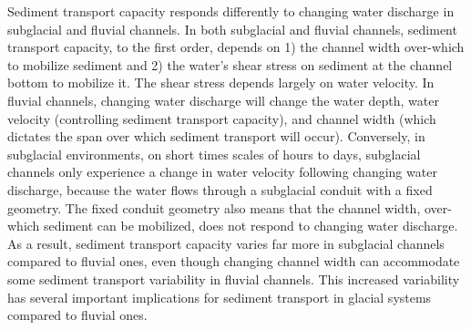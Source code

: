 \documentclass[11pt]{article}
\begin{document}
        \laysummary %
        Sediment transport capacity responds differently to changing water discharge in subglacial and fluvial channels.
        In both subglacial and fluvial channels, sediment transport capacity, to the first order, depends on 1) the channel width over-which to mobilize sediment and 2) the water's shear stress on sediment at the channel bottom to mobilize it.
        The shear stress depends largely on water velocity.
        In fluvial channels, changing water discharge will change the water depth, water velocity (controlling sediment transport capacity),  and channel width (which dictates the span over which sediment transport  will occur).
        Conversely, in subglacial environments, on short times scales of hours to days, subglacial channels only experience a change in water velocity following changing water discharge, because the water flows through a subglacial conduit with a fixed geometry.
        The fixed conduit geometry also means that the channel width, over-which sediment can be mobilized, does not respond to changing water discharge.
        As a result, sediment transport capacity varies far more in subglacial channels compared to fluvial ones, even though changing channel width can accommodate some sediment transport variability in fluvial channels.
        This increased variability has several important implications for sediment transport in glacial systems compared to fluvial ones.
        
\end{document}
